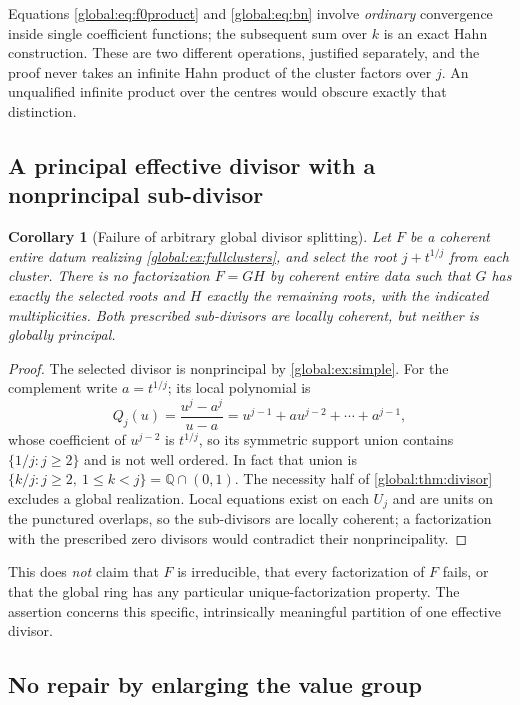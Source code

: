 \documentclass[11pt,letterpaper]{article}
\newtheorem{corollary}[corollary]{Corollary}
\theoremstyle{definition}
\theoremstyle{remark}
\newcommand{\Q}{\mathbb Q}
\numberwithin{equation}{section}
\begin{document}
Equations \eqref{global:eq:f0product} and \eqref{global:eq:bn} involve \emph{ordinary} convergence inside single coefficient functions; the subsequent sum over $k$ is an exact Hahn construction. These are two different operations, justified separately, and the proof never takes an infinite Hahn product of the cluster factors over $j$. An unqualified infinite product over the centres would obscure exactly that distinction.

\subsection{A principal effective divisor with a nonprincipal sub-divisor}

\begin{corollary}[Failure of arbitrary global divisor splitting]\label{global:cor:splitting}
Let $F$ be a coherent entire datum realizing \cref{global:ex:fullclusters}, and select the root $j+t^{1/j}$ from each cluster. There is no factorization $F=GH$ by coherent entire data such that $G$ has exactly the selected roots and $H$ exactly the remaining roots, with the indicated multiplicities. Both prescribed sub-divisors are locally coherent, but neither is globally principal.
\end{corollary}

\begin{proof}
The selected divisor is nonprincipal by \cref{global:ex:simple}. For the complement write $a=t^{1/j}$; its local polynomial is
\[
  Q_j(u)=\frac{u^j-a^j}{u-a}=u^{j-1}+au^{j-2}+\cdots+a^{j-1},
\]
whose coefficient of $u^{j-2}$ is $t^{1/j}$, so its symmetric support union contains $\{1/j:j\ge2\}$ and is not well ordered. In fact that union is $\{k/j:j\ge2,\ 1\le k<j\}=\Q\cap(0,1)$. The necessity half of \cref{global:thm:divisor} excludes a global realization. Local equations exist on each $U_j$ and are units on the punctured overlaps, so the sub-divisors are locally coherent; a factorization with the prescribed zero divisors would contradict their nonprincipality.
\end{proof}

This does \emph{not} claim that $F$ is irreducible, that every factorization of $F$ fails, or that the global ring has any particular unique-factorization property. The assertion concerns this specific, intrinsically meaningful partition of one effective divisor.

\subsection{No repair by enlarging the value group}\label{global:sub:norepair}
\end{document}
